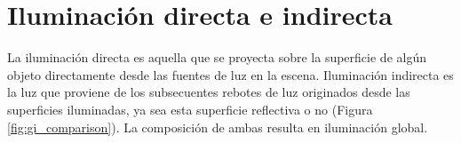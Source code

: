\section{Iluminación directa e indirecta}
\label{sec:direct_indirect}
La iluminación directa es aquella que se proyecta sobre la superficie de algún objeto directamente desde las fuentes de luz en la escena. Iluminación indirecta es la luz que proviene de los subsecuentes rebotes de luz originados desde las superficies iluminadas, ya sea esta superficie reflectiva o no \cite{advanced_gi2006} (Figura \ref{fig:gi_comparison}). La composición de ambas resulta en iluminación global.